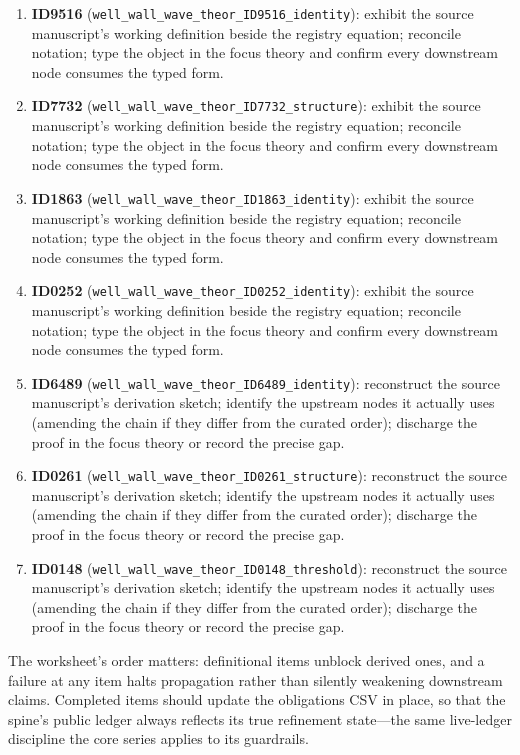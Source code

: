 \documentclass[11pt]{article}
\theoremstyle{remark}
\begin{document}
\begin{enumerate}
\item \textbf{ID9516} (\texttt{well\_wall\_wave\_theor\_ID9516\_identity}): exhibit the source manuscript's working definition beside the registry equation; reconcile notation; type the object in the focus theory and confirm every downstream node consumes the typed form.
\item \textbf{ID7732} (\texttt{well\_wall\_wave\_theor\_ID7732\_structure}): exhibit the source manuscript's working definition beside the registry equation; reconcile notation; type the object in the focus theory and confirm every downstream node consumes the typed form.
\item \textbf{ID1863} (\texttt{well\_wall\_wave\_theor\_ID1863\_identity}): exhibit the source manuscript's working definition beside the registry equation; reconcile notation; type the object in the focus theory and confirm every downstream node consumes the typed form.
\item \textbf{ID0252} (\texttt{well\_wall\_wave\_theor\_ID0252\_identity}): exhibit the source manuscript's working definition beside the registry equation; reconcile notation; type the object in the focus theory and confirm every downstream node consumes the typed form.
\item \textbf{ID6489} (\texttt{well\_wall\_wave\_theor\_ID6489\_identity}): reconstruct the source manuscript's derivation sketch; identify the upstream nodes it actually uses (amending the chain if they differ from the curated order); discharge the proof in the focus theory or record the precise gap.
\item \textbf{ID0261} (\texttt{well\_wall\_wave\_theor\_ID0261\_structure}): reconstruct the source manuscript's derivation sketch; identify the upstream nodes it actually uses (amending the chain if they differ from the curated order); discharge the proof in the focus theory or record the precise gap.
\item \textbf{ID0148} (\texttt{well\_wall\_wave\_theor\_ID0148\_threshold}): reconstruct the source manuscript's derivation sketch; identify the upstream nodes it actually uses (amending the chain if they differ from the curated order); discharge the proof in the focus theory or record the precise gap.
\end{enumerate}

The worksheet's order matters: definitional items unblock derived ones, and a failure at any item halts propagation rather than silently weakening downstream claims. Completed items should update the obligations CSV in place, so that the spine's public ledger always reflects its true refinement state---the same live-ledger discipline the core series applies to its guardrails.
\end{document}
